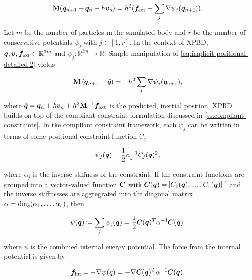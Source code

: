 \begin{equation}\label{eq:implicit-positional-detailed-2}
    \mathbf{M}(\bm{q}_{n+1} - \bm{q}_n - h\bm{v}_n) = h^2(\bm{f_\text{ext}} - \sum_j \nabla \psi_j(\bm{q}_{n+1})).
\end{equation}

\noindent Let $m$ be the number of particles in the simulated body and $r$ be the number of conservative potentials $\psi_j$ with $j \in [1, r]$.
In the context of XPBD, $\bm{q}, \bm{v}, \bm{f}_{\text{ext}} \in \mathbb{R}^{3m}$ and $\psi_j \colon \mathbb{R}^{3m} \to \mathbb{R}$. Simple 
manipulation of \autoref{eq:implicit-positional-detailed-2} yields

\begin{equation}\label{eq:implicit-positional-detailed-3}
    \mathbf{M} \left( \bm{q}_{n+1} - \tilde{\bm{q}} \right) = - h^2 \sum_j \nabla \psi_j(\bm{q}_{n+1}),
\end{equation}

\noindent where $\tilde{\bm{q}} = \bm{q}_n + h\bm{v}_n + h^2 \mathbf{M}^{-1} \bm{f}_{\text{ext}}$ is the predicted, inertial position. XPBD builds on
top of the compliant constraint formulation discussed in \cref{ss:compliant-constraints}. In the compliant constraint framework, each $\psi_j$ 
can be written in terms of some positional constraint function $C_j$ 

\begin{equation}\label{eq:xpbd-potential-j}
    \psi_j(\bm{q}) = \frac{1}{2} \alpha^{-1}_j C_j(\bm{q})^2,
\end{equation}

\noindent where $\alpha_j$ is the inverse stiffness of the constraint. If the constraint functions are grouped into a vector-valued function
$\bm{C}$ with $\bm{C}(\bm{q}) = [C_1(\bm{q}), \ldots, C_r(\bm{q})]^T$ and the inverse stiffnesses are aggregrated into the diagonal matrix
$\mathbf{\alpha} = \text{diag}(\alpha_1, \ldots, \alpha_r)$, then

\begin{equation}\label{eq:xpbd-potential}
    \psi(\bm{q}) \coloneq \sum_j \psi_j(\bm{q}) = \frac{1}{2}\bm{C}(\bm{q})^T \mathbf{\alpha}^{-1} \bm{C}(\bm{q}).
\end{equation}

\noindent where $\psi$ is the combined internal energy potential. The force from the internal potential is given by

\begin{equation}\label{eq:xpbd-internal-force}
    \bm{f}_{\text{int}} = -\nabla \psi(\bm{q}) = -\nabla \bm{C}(\bm{q})^T \mathbf{\alpha}^{-1} \bm{C}(\bm{q}).
\end{equation}

